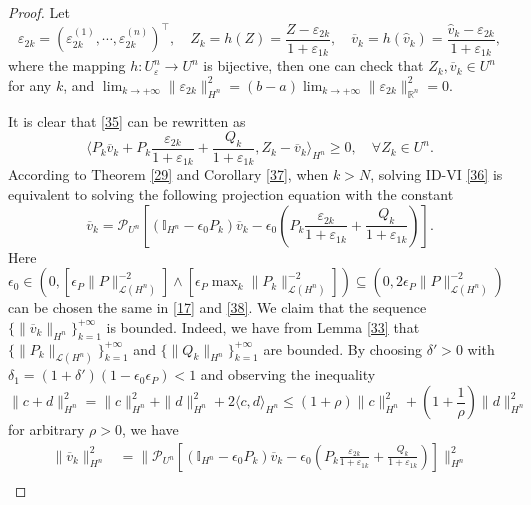 \documentclass[10pt,a4paper]{amsart}
\begin{document}
\begin{proof}
Let
\begin{equation}\label{50}
\varepsilon_{2k}=(\varepsilon^{(1)}_{2k},\cdots,\varepsilon^{(n)}_{2k})^{\top}, \quad Z_k=h(Z)=\frac{Z-\varepsilon_{2k}}{1+\varepsilon_{1k}},\quad \overline{v}_k=h(\widehat{v}_k)=\frac{\widehat{v}_k-\varepsilon_{2k}}{1+\varepsilon_{1k}},
\end{equation}
where the mapping $h:U^n_{\varepsilon}\rightarrow U^n$ is  bijective, then one can check that $Z_k,\overline{v}_k\in U^n$ for any $k$, and
$\lim_{k\rightarrow+\infty}\|\varepsilon_{2k}\|_{H^n}^2=(b-a)\lim_{k\rightarrow+\infty}\|\varepsilon_{2k}\|_{\mathbb{R}^n}^2=0.$

It is clear that \eqref{35} can be rewritten as
\begin{equation}\label{36}
\langle P_k\overline{v}_k+P_k\frac{\varepsilon_{2k}}{1+\varepsilon_{1k}}+\frac{Q_k}{1+\varepsilon_{1k}},Z_k-\overline{v}_k\rangle_{H^n}\geq 0,\quad \forall Z_k\in U^n.
\end{equation}
According to Theorem \ref{29} and Corollary \ref{37}, when $k>N$,  solving ID-VI \eqref{36} is equivalent to solving the following projection equation with the constant 
\begin{equation}\label{38}
\overline{v}_k=\mathcal{P}_{U^n}[(\mathbb{I}_{H^n}-\epsilon_0P_k)\overline{v}_k-\epsilon_0(P_k\frac{\varepsilon_{2k}}{1+\varepsilon_{1k}}+\frac{Q_k}{1+\varepsilon_{1k}})].
\end{equation}
Here  $\epsilon_0\in(0,[\epsilon_P\|P\|_{\mathcal{L}(H^n)}^{-2}]\wedge [\epsilon_P\max_{k}\|P_k\|_{\mathcal{L}(H^n)}^{-2}])\subseteq(0,2\epsilon_P\|P\|_{\mathcal{L}(H^n)}^{-2})$ can be chosen the same in \eqref{17} and \eqref{38}. We claim that the sequence $\{\|\overline{v}_k\|_{H^n}\}_{k=1}^{+\infty}$ is bounded. Indeed, we have from Lemma \ref{33} that
$\{\|P_k\|_{\mathcal{L}(H^n)}\}_{k=1}^{+\infty}$ and $\{\|Q_k\|_{H^n}\}_{k=1}^{+\infty}$ are bounded. By choosing $\delta'>0$ with $\delta_1=(1+\delta')(1-\epsilon_0\epsilon_P)<1$ and observing the inequality 
\begin{equation}\label{41}
\|c+d\|_{H^n}^2=\|c\|_{H^n}^2+\|d\|_{H^n}^2+2\langle c,d\rangle_{H^n}\leq(1+\rho)\|c\|_{H^n}^2+(1+\frac{1}{\rho})\|d\|_{H^n}^2
\end{equation}
for arbitrary $\rho>0$, we have
\begin{align*}
\|\overline{v}_k\|_{H^n}^2&=\|\mathcal{P}_{U^n}[(\mathbb{I}_{H^n}-\epsilon_0P_k)\overline{v}_k-\epsilon_0(P_k\frac{\varepsilon_{2k}}{1+\varepsilon_{1k}}+\frac{Q_k}{1+\varepsilon_{1k}})]\|_{H^n}^2\\

\end{align*}
\end{proof}
\end{document}
